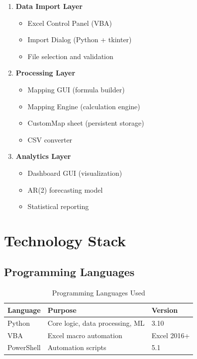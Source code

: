 \begin{enumerate}
    \item \textbf{Data Import Layer}
    \begin{itemize}
        \item Excel Control Panel (VBA)
        \item Import Dialog (Python + tkinter)
        \item File selection and validation
    \end{itemize}
    
    \item \textbf{Processing Layer}
    \begin{itemize}
        \item Mapping GUI (formula builder)
        \item Mapping Engine (calculation engine)
        \item CustomMap sheet (persistent storage)
        \item CSV converter
    \end{itemize}
    
    \item \textbf{Analytics Layer}
    \begin{itemize}
        \item Dashboard GUI (visualization)
        \item AR(2) forecasting model
        \item Statistical reporting
    \end{itemize}
\end{enumerate}

\section{Technology Stack}

\subsection{Programming Languages}

\begin{table}[H]
\centering
\begin{tabularx}{\textwidth}{lXl}
\toprule
\textbf{Language} & \textbf{Purpose} & \textbf{Version} \\
\midrule
Python & Core logic, data processing, ML & 3.10 \\
VBA & Excel macro automation & Excel 2016+ \\
PowerShell & Automation scripts & 5.1 \\
\bottomrule
\end{tabularx}
\caption{Programming Languages Used}
\end{table}

